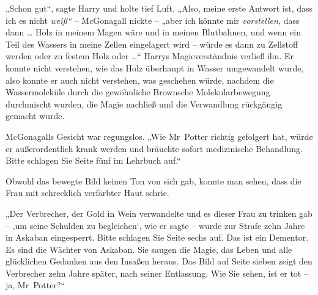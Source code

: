 „Schon gut“, sagte Harry und holte tief Luft. „Also, meine erste Antwort ist, dass ich es nicht \emph{weiß“} – McGonagall nickte – „aber ich könnte mir \emph{vorstellen,} dass dann … Holz in meinem Magen wäre und in meinen Blutbahnen, und wenn ein Teil des Wassers in meine Zellen eingelagert wird – würde es dann zu Zellstoff werden oder zu festem Holz oder …“ Harrys Magieverständnis verließ ihn. Er konnte nicht verstehen, wie das Holz überhaupt in Wasser umgewandelt wurde, also konnte er auch nicht verstehen, was geschehen würde, nachdem die Wassermoleküle durch die gewöhnliche Brownsche Molekularbewegung durchmischt wurden, die Magie nachließ und die Verwandlung rückgängig gemacht wurde. 

McGonagalls Gesicht war regungslos. „Wie Mr~Potter richtig gefolgert hat, würde er außerordentlich krank werden und bräuchte sofort medizinische Behandlung. Bitte schlagen Sie Seite fünf im Lehrbuch auf.“ 

Obwohl das bewegte Bild keinen Ton von sich gab, konnte man sehen, dass die Frau mit schrecklich verfärbter Haut schrie. 

„Der Verbrecher, der Gold in Wein verwandelte und es dieser Frau zu trinken gab – ‚um seine Schulden zu begleichen‘, wie er sagte – wurde zur Strafe zehn Jahre in Askaban eingesperrt. Bitte schlagen Sie Seite sechs auf. Das ist ein Dementor. Es sind die Wächter von Askaban. Sie saugen die Magie, das Leben und alle glücklichen Gedanken aus den Insaßen heraus. Das Bild auf Seite sieben zeigt den Verbrecher zehn Jahre später, nach seiner Entlassung. Wie Sie sehen, ist er tot – ja, Mr~Potter?“ 

